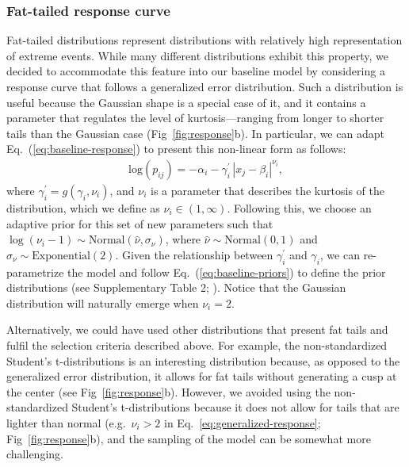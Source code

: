 \documentclass[11pt, a4paper]{article}
\begin{document}
\subsubsection*{Fat-tailed response curve}
Fat-tailed distributions represent distributions with relatively high representation of extreme events. While many different distributions exhibit this property, we decided to accommodate this feature into our baseline model by considering a response curve that follows a generalized error distribution. Such a distribution is useful because the Gaussian shape is a special case of it, and it contains a parameter that regulates the level of kurtosis---ranging from longer to shorter tails than the Gaussian case (Fig~\ref{fig:response}b). In particular, we can adapt Eq.~(\ref{eq:baseline-response}) to present this non-linear form as follows:
\begin{equation}
\begin{split}
\text{log}\left(p_{ij}\right) = -\alpha_{i} - \gamma^{\prime}_{i}\, |x_{j}-\beta_{i}|^{\nu_{i}} ,
\end{split}
\label{eq:generalized-response}
\end{equation}
where $\gamma^{\prime}_{i} = g(\gamma_{i}, \nu_{i})$, and $\nu_{i}$ is a parameter that describes the kurtosis of the distribution, which we define as $\nu_{i}\in\left(1, \infty\right)$. Following this, we choose an adaptive prior for this set of new parameters such that $\log\left(\nu_{i}-1\right)\sim \text{Normal}\left(\hat{\nu}, \sigma_{\nu}\right)$, where $\hat{\nu}\sim\text{Normal}\left(0, 1\right)$ and $\sigma_{\nu}\sim\text{Exponential}\left(2\right)$. Given the relationship between $\gamma^{\prime}_{i}$ and $\gamma_{i}$,  we can re-parametrize the model and follow Eq.~(\ref{eq:baseline-priors}) to define the prior distributions (see Supplementary Table 2; \citealt{nadarajahGeneralizedNormalDistribution2005}). Notice that the Gaussian distribution will naturally emerge when $\nu_i=2$.

Alternatively, we could have used other distributions that present fat tails and fulfil the selection criteria described above. For example, the non-standardized Student's t-distributions is an interesting distribution because, as opposed to the generalized error distribution, it allows for fat tails without generating a cusp at the center (see Fig~\ref{fig:response}b). However, we avoided using the non-standardized Student's t-distributions because it does not allow for tails that are lighter than normal (e.g.~$\nu_i>2$ in Eq.~\ref{eq:generalized-response}; Fig~\ref{fig:response}b), and the sampling of the model can be somewhat more challenging. 
\end{document}
